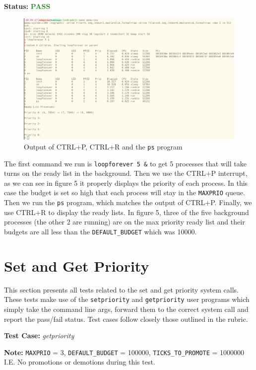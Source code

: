 \documentclass[11pt,letterpaper]{report}
\newcommand{\code}[1]{\colorbox{codegray}{\texttt{#1}}}
\begin{document}
{  \noindent\textbf{Status:} \textcolor{ForestGreen}{\textbf{PASS}}
  
  \begin{figure}[h!]
	\centering
	\includegraphics[width=1\linewidth]{updated-commands.png}
	\caption[img]{Output of CTRL+P, CTRL+R and the \code{ps} program}
	\label{fig:P1compileP0-1}
  \end{figure}

  The first command we run is \code{loopforever 5 \&} to get 5 processes that will take turns
  on the ready list in the background. Then we use the CTRL+P interrupt, as we can see in 
  figure 5 it properly displays the priority of each process. In this case the budget is set so
  high that each process will stay in the \code{MAXPRIO} queue. Then we run the \code{ps}
  program, which matches the output of CTRL+P. Finally, we use CTRL+R to display the ready lists.
  In figure 5, three of the five background processes (the other 2 are running) are on the max priority ready list and their budgets are all 
  less than the \code{DEFAULT\_BUDGET} which was 10000.

  \section*{Set and Get Priority}
  This section presents all tests related to the set and get priority system calls. These 
  tests make use of the \code{setpriority} and \code{getpriority} user programs which 
  simply take the command line args, forward them to the correct system call and report 
  the pass/fail status. Test cases follow closely those outlined in the rubric. \hfill \break

  \noindent\textbf{Test Case:} \emph{getpriority}
  
  \noindent\textbf{Note:} \code{MAXPRIO} = 3, \code{DEFAULT\_BUDGET} = 100000, \code{TICKS\_TO\_PROMOTE} = 1000000
  I.E. No promotions or demotions during this test.

}
\end{document}
